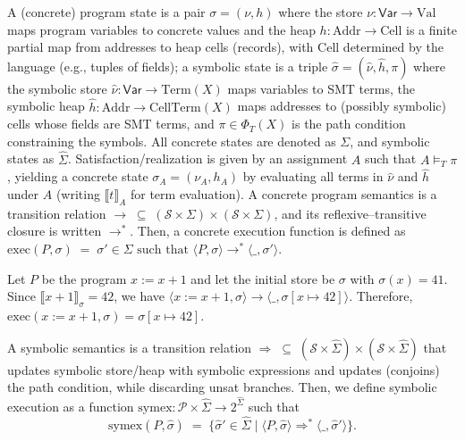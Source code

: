 \documentclass[acmsmall]{acmart}
\theoremstyle{definition}
\begin{document}
A (concrete) program state is a pair $\sigma=(\nu,h)$ where the store $\nu:\mathsf{Var}\to\mathrm{Val}$ maps program variables to concrete values and the heap $h:\mathrm{Addr}\rightarrow \mathrm{Cell}$ is a finite partial map from addresses to heap cells (records), with $\mathrm{Cell}$ determined by the language (e.g., tuples of fields); a symbolic state is a triple $\hat\sigma=(\hat\nu,\hat h,\pi)$ where the symbolic store $\hat\nu:\mathsf{Var}\to\mathrm{Term}(X)$ maps variables to SMT terms, the symbolic heap $\hat h:\mathrm{Addr}\rightarrow \mathrm{CellTerm}(X)$ maps addresses to (possibly symbolic) cells whose fields are SMT terms, and $\pi\in\Phi_{T}(X)$ is the path condition constraining the symbols. All concrete states are denoted as $\Sigma$, and symbolic states as $\widehat{\Sigma}$. Satisfaction/realization is given by an assignment $A$ such that $A\models_T \pi$, yielding a concrete state $\sigma_A=(\nu_A,h_A)$ by evaluating all terms in $\hat\nu$ and $\hat h$ under $A$ (writing $\llbracket t\rrbracket_A$ for term evaluation). A concrete program semantics is a transition relation $\to \;\subseteq\; (\mathcal S\times \Sigma)\times(\mathcal S\times \Sigma)$, and its reflexive–transitive closure is written $\to^{*}$. Then, a concrete execution function is defined as $\mathrm{exec}(P,\sigma)\;=\;\sigma' \in \Sigma \text{ such that } \langle P,\sigma\rangle \to^{*} \langle \_,\sigma'\rangle.$

\begin{example}
Let $P$ be the program $x := x + 1$ and let the initial store be
$\sigma$ with $\sigma(x)=41$. Since $\llbracket x+1\rrbracket_\sigma = 42$, we have $\langle x := x + 1,\sigma\rangle \to \langle \_, \sigma[x \mapsto 42]\rangle$. Therefore, $\mathrm{exec}(x := x+1,\sigma)=\sigma[x \mapsto 42]$.
\end{example}

A symbolic semantics is a transition relation $\Rightarrow \;\subseteq\; (\mathcal S\times \widehat\Sigma)\times(\mathcal S\times \widehat\Sigma)$ that updates symbolic store/heap with symbolic expressions and updates (conjoins) the path condition, while discarding unsat branches. Then, we define symbolic execution as a function $\mathrm{symex}:\mathcal P\times \widehat\Sigma \to 2^{\widehat\Sigma}$ such that
\[
\mathrm{symex}(P,\hat\sigma)\;=\;\{\hat\sigma' \in \widehat\Sigma \mid \langle P,\hat\sigma\rangle \Rightarrow^{*} \langle \_,\hat\sigma'\rangle\}.
\]
\end{document}
